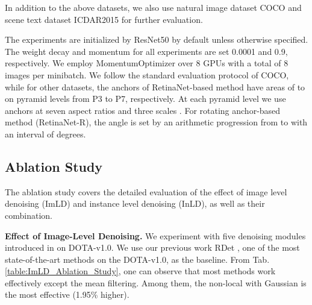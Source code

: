 \documentclass[10pt,journal,compsoc]{IEEEtran}
\begin{document}
In addition to the above datasets, we also use natural image dataset COCO \cite{lin2014microsoft} and scene text dataset ICDAR2015 \cite{karatzas2015icdar} for further evaluation. 



The experiments are initialized by ResNet50 \cite{he2016deep} by default unless otherwise specified. The weight decay and momentum for all experiments are set 0.0001 and 0.9, respectively. We employ MomentumOptimizer over 8 GPUs with a total of 8 images per minibatch.  We follow the standard evaluation protocol of COCO, while for other datasets, the anchors of RetinaNet-based method have areas of  to  on pyramid levels from P3 to P7, respectively. At each pyramid level we use anchors at seven aspect ratios  and three scales . For rotating
anchor-based method (RetinaNet-R), the angle is set by an arithmetic progression from  to  with an interval of  degrees.

\subsection{Ablation Study}
The ablation study covers the detailed evaluation of the effect of image level denoising (ImLD) and instance level denoising (InLD), as well as their combination.

\textbf{Effect of Image-Level Denoising.}
We experiment with five denoising modules introduced in \cite{xie2019feature} on DOTA-v1.0. We use our previous work RDet \cite{ yang2021r3det}, one of the most state-of-the-art methods on the DOTA-v1.0, as the baseline. From Tab. \ref{table:ImLD_Ablation_Study}, one can observe that most methods work effectively except the mean filtering. Among them, the non-local with Gaussian is the most effective (1.95\% higher).
\end{document}

